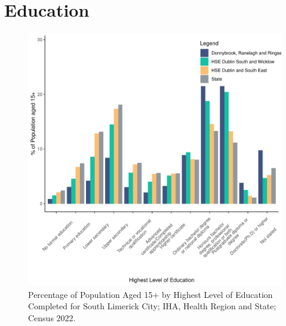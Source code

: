 \documentclass{article}
\begin{document}
\section{Education}\label{sect:Edu}
\begin{figure}[H]
	\centering
	\includegraphics[width = 120mm]{../figures/EduED.pdf}
	\caption{Percentage of Population Aged 15+ by Highest Level of Education Completed for South Limerick City; IHA, Health Region and State; Census 2022.}
	\label{fig:vbnv}
	\end{figure}
\end{document}
